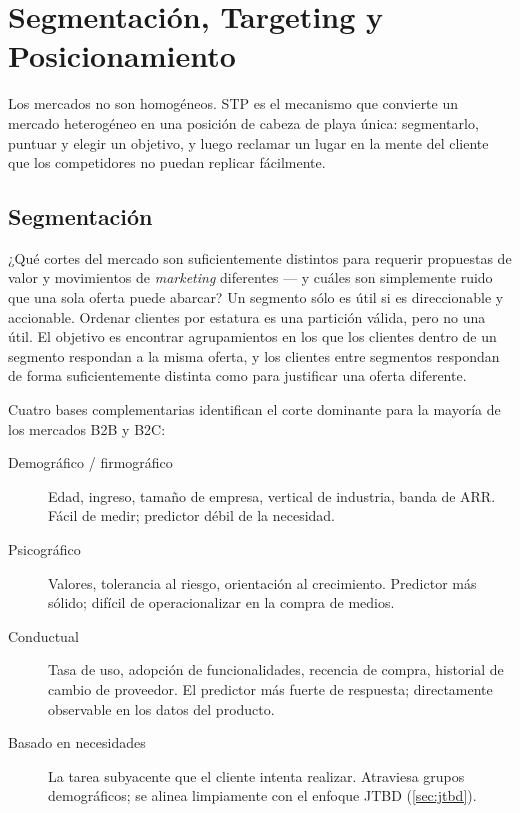 \chapter{Segmentación, Targeting y Posicionamiento}\label{ch:segmentation-targeting-positioning}


Los mercados no son homogéneos. STP es el mecanismo que convierte un mercado heterogéneo en una posición de cabeza de playa única: segmentarlo, puntuar y elegir un objetivo, y luego reclamar un lugar en la mente del cliente que los competidores no puedan replicar fácilmente.

\section{Segmentación}\label{sec:segmentation}

¿Qué cortes del mercado son suficientemente distintos para requerir propuestas de valor y movimientos de \emph{marketing} diferentes --- y cuáles son simplemente ruido que una sola oferta puede abarcar? Un segmento sólo es útil si es direccionable y accionable. Ordenar clientes por estatura es una partición válida, pero no una útil. El objetivo es encontrar agrupamientos en los que los clientes dentro de un segmento respondan a la misma oferta, y los clientes entre segmentos respondan de forma suficientemente distinta como para justificar una oferta diferente.

Cuatro bases complementarias identifican el corte dominante para la mayoría de los mercados B2B y B2C:

\begin{description}
  \item[Demográfico / firmográfico] Edad, ingreso, tamaño de empresa, vertical de industria, banda de ARR. Fácil de medir; predictor débil de la necesidad.
  \item[Psicográfico] Valores, tolerancia al riesgo, orientación al crecimiento. Predictor más sólido; difícil de operacionalizar en la compra de medios.
  \item[Conductual] Tasa de uso, adopción de funcionalidades, recencia de compra, historial de cambio de proveedor. El predictor más fuerte de respuesta; directamente observable en los datos del producto.
  \item[Basado en necesidades] La tarea subyacente que el cliente intenta realizar. Atraviesa grupos demográficos; se alinea limpiamente con el enfoque JTBD (\cref{sec:jtbd}).
\end{description}

